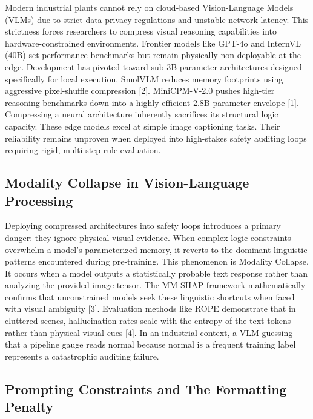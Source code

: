 \documentclass{article}
\begin{document}
Modern industrial plants cannot rely on cloud-based Vision-Language Models (VLMs) due to strict data privacy regulations and unstable network latency. This strictness forces researchers to compress visual reasoning capabilities into hardware-constrained environments. Frontier models like GPT-4o and InternVL (40B) set performance benchmarks but remain physically non-deployable at the edge. Development has pivoted toward sub-3B parameter architectures designed specifically for local execution. SmolVLM reduces memory footprints using aggressive pixel-shuffle compression [2]. MiniCPM-V-2.0 pushes high-tier reasoning benchmarks down into a highly efficient 2.8B parameter envelope [1]. Compressing a neural architecture inherently sacrifices its structural logic capacity. These edge models excel at simple image captioning tasks. Their reliability remains unproven when deployed into high-stakes safety auditing loops requiring rigid, multi-step rule evaluation.

\subsection*{Modality Collapse in Vision-Language Processing}

Deploying compressed architectures into safety loops introduces a primary danger: they ignore physical visual evidence. When complex logic constraints overwhelm a model's parameterized memory, it reverts to the dominant linguistic patterns encountered during pre-training. This phenomenon is Modality Collapse. It occurs when a model outputs a statistically probable text response rather than analyzing the provided image tensor. The MM-SHAP framework mathematically confirms that unconstrained models seek these linguistic shortcuts when faced with visual ambiguity [3]. Evaluation methods like ROPE demonstrate that in cluttered scenes, hallucination rates scale with the entropy of the text tokens rather than physical visual cues [4]. In an industrial context, a VLM guessing that a pipeline gauge reads normal because normal is a frequent training label represents a catastrophic auditing failure.

\subsection*{Prompting Constraints and The Formatting Penalty}
\end{document}
